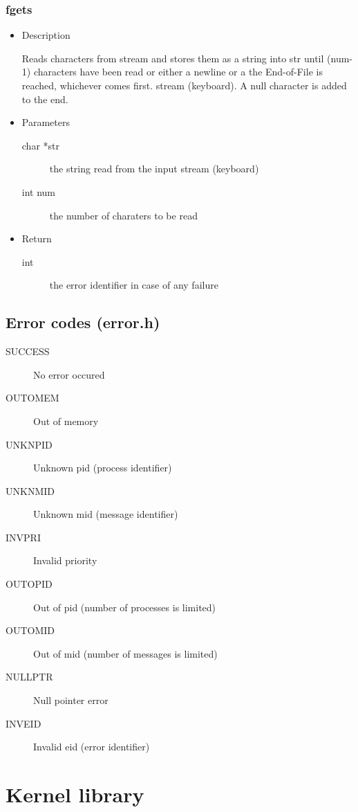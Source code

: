 \subsubsection{fgets}
\begin{itemize}
\item{Description}

	Reads characters from stream and stores them as a string into str until (num-1)
	characters have been read or either a newline or a the End-of-File is reached,
	whichever comes first. stream (keyboard). A null character is added to the end.
\item{Parameters}
	\begin{description}
	\item[char *str]  the string read from the input stream (keyboard)
	\item[int num]  the number of charaters to be read
	\end{description}
\item{Return}
	\begin{description}
	\item[int] the error identifier in case of any failure
	\end{description}
\end{itemize}

\subsection{Error codes (error.h)}
	\begin{description}
	\item[SUCCESS] No error occured
	\item[OUTOMEM] Out of memory
	\item[UNKNPID] Unknown pid (process identifier)
	\item[UNKNMID] Unknown mid (message identifier)
	\item[INVPRI] Invalid priority
	\item[OUTOPID] Out of pid (number of processes is limited) 
	\item[OUTOMID] Out of mid (number of messages is limited) 
	\item[NULLPTR] Null pointer error
	\item[INVEID] Invalid eid (error identifier)
	\end{description}

\section{Kernel library}
